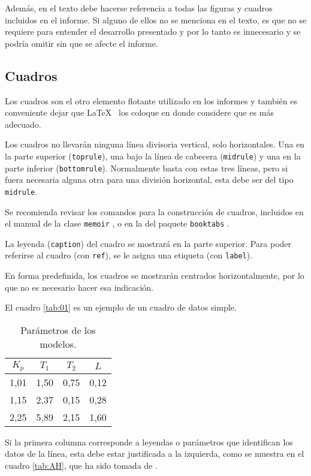 Además, en el texto debe hacerse referencia a todas las figuras y cuadros incluidos en el informe.  Si alguno de ellos no se menciona en el texto, es que no se requiere para entender el desarrollo presentado y por lo tanto es innecesario y se podría omitir sin que se afecte el informe.

\subsection{Cuadros}
Los cuadros son el otro elemento flotante utilizado en los informes y también es conveniente dejar que \LaTeX~ los coloque en donde considere que es más adecuado.

Los cuadros no llevarán ninguna línea divisoria vertical, solo horizontales. Una en la parte superior (\texttt{toprule}), una bajo la línea de cabecera (\texttt{midrule}) y una en la parte inferior (\texttt{bottomrule}).  Normalmente basta con estas tres líneas, pero si fuera necesaria alguna otra para una división horizontal, esta debe ser del tipo \texttt{midrule}.

Se recomienda revisar los comandos para la construcción de cuadros, incluidos en el manual de la clase \texttt{memoir} \cite{memoir2011}, o en la del paquete \texttt{booktabs} \cite{fear2005}.

La leyenda (\texttt{caption}) del cuadro se mostrará en la parte superior.  Para poder referirse al cuadro (con \texttt{ref}), se le asigna una etiqueta (con \texttt{label}).

En forma predefinida, los cuadros se mostrarán centrados horizontalmente, por lo que no es necesario hacer esa indicación. 

El cuadro \ref{tab:01} es un ejemplo de un cuadro de datos simple.

\begin{table}
\caption{Parámetros de los modelos.} \label{tab:01o}
		\begin{tabular}{@{}*{4}{c}@{}}
    \toprule
    $K_p$ & $T_1$ & $T_2$ & $L$ \\
    \midrule
     1,01 & 1,50 & 0,75 & 0,12 \\
		 1,15 & 2,37 & 0,15 & 0,28 \\
		 2,25 & 5,89 & 2,15 & 1,60 \\
    \bottomrule
    \end{tabular}
\end{table}

Si la primera columna corresponde a leyendas o parámetros que identifican los datos de la línea, esta debe estar justificada a la izquierda, como se muestra en el cuadro \ref{tab:AH}, que ha sido tomada de \cite{astromhagglund2006}.

